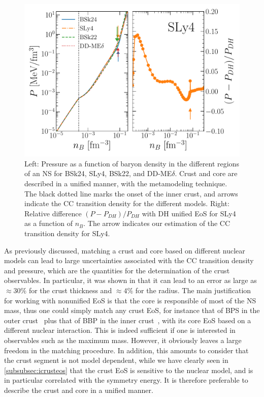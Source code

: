 \begin{figure}[!t]
\begin{center}
  \includegraphics[width=0.9\linewidth]{figures/unified.pdf}
\end{center}
\caption[Unified metamodeling of the equation of state]{Left: Pressure as a
function of baryon density in the different regions of an NS for BSk24, SLy4,
BSk22, and DD-ME$\delta$. Crust and core are described in a unified manner, 
with the metamodeling technique. The black dotted line marks the onset of the 
inner crust, and arrows indicate the CC transition density for the
different models. Right: Relative difference $(P - P_{DH})/P_{DH}$ with 
DH unified EoS for SLy4~\cite{Douchin2001} as a function 
of $n_B$. The arrow indicates our estimation of the CC transition 
density for SLy4.}\label{fig:unified}
\end{figure}

As previously discussed, matching a crust and core based on different nuclear
models can lead to large uncertainties associated with the CC transition
density and pressure, which are the quantities for the determination of the
crust observables. In particular, it was shown in \cite{Fortin2016} that it 
can lead to an error as large as $\approx 30\%$ for the crust thickness and
$\approx 4\%$ for the radius. The main justification for working with nonunified 
EoS is that the core is responsible of most of the NS mass, thus one could 
simply match any crust EoS, for instance that of BPS in the outer 
crust~\cite{BPS} plus that of BBP in the inner crust~\cite{BBP}, 
with its core EoS based on a different nuclear interaction. This is indeed 
sufficient if one is interested in observables such as the maximum mass. 
However, it obviously leaves a large freedom in the matching procedure. In 
addition, this amounts to consider that the crust segment is not model 
dependent, while we have clearly 
seen in \ref{subsubsec:icrusteos} that the crust EoS is sensitive to the 
nuclear model, and is in particular correlated with the symmetry energy. It 
is therefore preferable to describe the crust and core in a unified 
manner.

